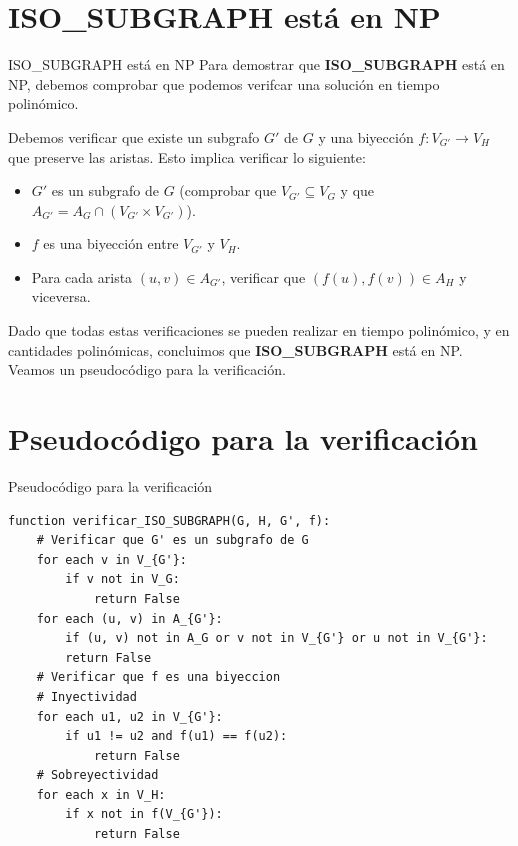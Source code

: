 \documentclass[aspectratio=169]{beamer}
\begin{document}
\section{ISO\_SUBGRAPH está en NP}
\begin{frame}{ISO\_SUBGRAPH está en NP}
    Para demostrar que \textbf{ISO\_SUBGRAPH} está en NP, debemos comprobar que podemos verifcar una solución en tiempo polinómico.

    Debemos verificar que existe un subgrafo $G'$ de $G$ y una biyección $f : V_{G'} \to V_H$ que preserve las aristas. Esto implica verificar lo siguiente:

    \begin{itemize}
        \item $G'$ es un subgrafo de $G$ (comprobar que $V_{G'} \subseteq V_G$ y que $A_{G'} = A_G \cap (V_{G'} \times V_{G'})$).
        \item $f$ es una biyección entre $V_{G'}$ y $V_H$.
        \item Para cada arista $(u, v) \in A_{G'}$, verificar que $(f(u), f(v)) \in A_H$ y viceversa.
    \end{itemize}

    Dado que todas estas verificaciones se pueden realizar en tiempo
    polinómico, y en cantidades polinómicas, concluimos que \textbf{ISO\_SUBGRAPH} está en NP.\\
    Veamos un pseudocódigo para la verificación.
\end{frame}

\section{Pseudocódigo para la verificación}
\begin{frame}[fragile]{Pseudocódigo para la verificación}
    \begin{lstlisting}[basicstyle=\ttfamily\footnotesize]
function verificar_ISO_SUBGRAPH(G, H, G', f):
    # Verificar que G' es un subgrafo de G
    for each v in V_{G'}:
        if v not in V_G:
            return False
    for each (u, v) in A_{G'}:
        if (u, v) not in A_G or v not in V_{G'} or u not in V_{G'}:
        return False
    # Verificar que f es una biyeccion
    # Inyectividad
    for each u1, u2 in V_{G'}:
        if u1 != u2 and f(u1) == f(u2):
            return False
    # Sobreyectividad
    for each x in V_H:
        if x not in f(V_{G'}):
            return False
    \end{lstlisting}
\end{frame}
\end{document}
